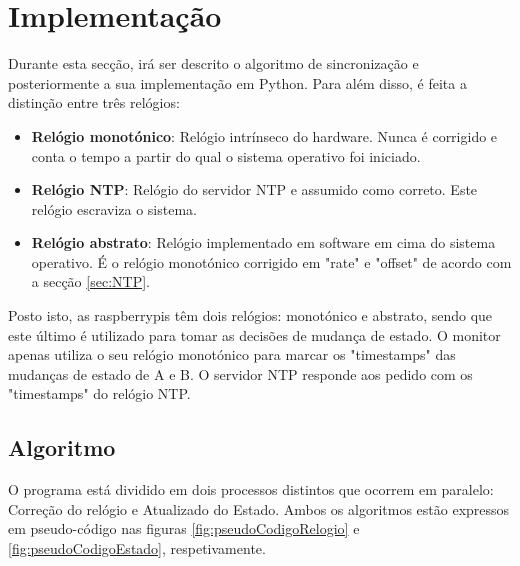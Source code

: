 \section{Implementação} \label{sec:implementação}
    Durante esta secção, irá ser descrito o algoritmo de sincronização e posteriormente a sua implementação em Python. Para além disso, é feita a distinção entre três relógios:
    
    \begin{itemize}
        \item \textbf{Relógio monotónico}:  Relógio intrínseco do hardware. Nunca é corrigido e conta o tempo a partir do qual o sistema operativo foi iniciado.
        \item \textbf{Relógio NTP}: Relógio do servidor NTP e assumido como correto. Este relógio escraviza o sistema.
        \item \textbf{Relógio abstrato}: Relógio implementado em software em cima do sistema operativo. É o relógio monotónico corrigido em "rate" e "offset" de acordo com a secção \ref{sec:NTP}.
    \end{itemize}

    Posto isto, as raspberrypis têm dois relógios: monotónico e abstrato, sendo que este último é utilizado para tomar as decisões de mudança de estado. O monitor apenas utiliza o seu relógio monotónico para marcar os "timestamps" das mudanças de estado de A e B. O servidor NTP responde aos pedido com os "timestamps" do relógio NTP. 

\subsection{Algoritmo}
    O programa está dividido em dois processos distintos que ocorrem em paralelo: Correção do relógio e Atualizado do Estado. Ambos os algoritmos estão expressos em pseudo-código nas figuras \ref{fig:pseudoCodigoRelogio} e \ref{fig:pseudoCodigoEstado}, respetivamente.
    
    

